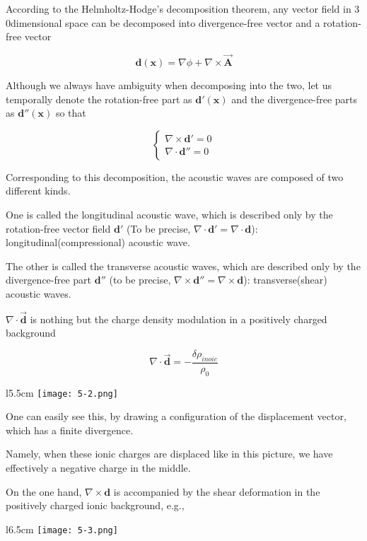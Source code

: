 According to the Helmholtz-Hodge's decomposition theorem, any vector field in $3$0dimensional space can be decomposed into divergence-free vector and a rotation-free vector

\[\bm{d(x)} = \nabla\phi + \nabla\times\vec{\bm{A}} \]

Although we always have ambiguity when decomposing into the two, let us temporally denote the rotation-free part as $\bm{d'(x)}$ and the divergence-free parts as $\bm{d''(x)}$ so that

\[\begin{cases}
\nabla\times\bm{d'} = 0\\
\nabla\cdot\bm{d''} = 0
\end{cases}\]

Corresponding to this decomposition, the acoustic waves are composed of two different kinds. 

One is called the longitudinal acoustic wave, which is described only by the rotation-free vector field $\bm{d'}$ (To be precise, $\nabla\cdot \bm{d'} = \nabla\cdot\bm{d}$): longitudinal(compressional) acoustic wave. 

The other is called the transverse acoustic waves, which are described only by the divergence-free part $\bm{d''}$ (to be precise, $\nabla\times\bm{d''} = \nabla\times\bm{d}$): transverse(shear) acoustic waves. 

$\nabla\cdot \vec{\bm{d}}$ is nothing but the charge density modulation in a positively charged background

\[\nabla\cdot\vec{\bm{d}} = -\frac{\delta\rho_{inoic}}{\rho_0}\]

\begin{wrapfigure}{l}{5.5cm}
\texttt{[image: 5-2.png]}
\end{wrapfigure}
One can easily see this, by drawing a configuration of the displacement vector, which has a finite divergence. 

Namely, when these ionic charges are displaced like in this picture, we have effectively a negative charge in the middle. 

On the one hand, $\nabla\times\bm{d}$ is accompanied by the shear deformation in the positively charged ionic background, e.g.,

\begin{figure}
\end{figure}
\begin{wrapfigure}{l}{6.5cm}
\texttt{[image: 5-3.png]}
\end{wrapfigure}


